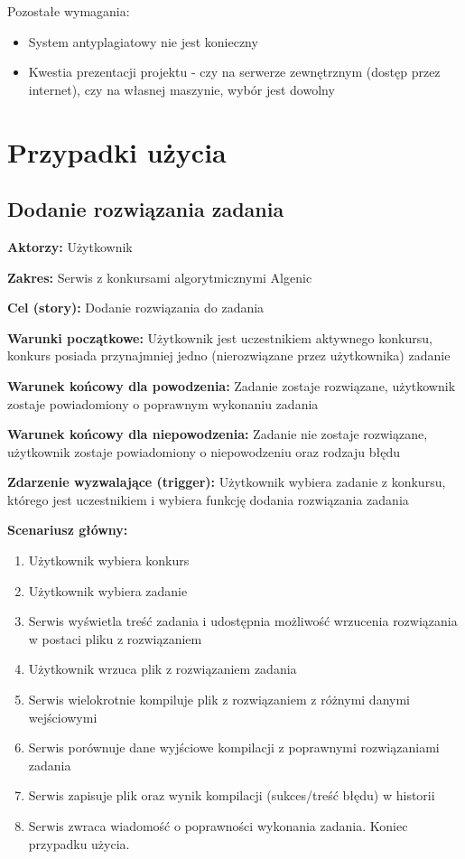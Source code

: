 \documentclass{article}
\begin{document}
Pozostałe wymagania:
\begin{itemize}
	\item System antyplagiatowy nie jest konieczny
	\item Kwestia prezentacji projektu - czy na serwerze zewnętrznym (dostęp przez internet), czy na własnej maszynie, wybór jest dowolny
\end{itemize}

\newpage
\section{Przypadki użycia}

\subsection{Dodanie rozwiązania zadania}

\textbf{Aktorzy:} Użytkownik

\textbf{Zakres:} Serwis z konkursami algorytmicznymi Algenic

\textbf{Cel (story):} Dodanie rozwiązania do zadania

\textbf{Warunki początkowe:} Użytkownik jest uczestnikiem aktywnego konkursu, konkurs posiada przynajmniej jedno (nierozwiązane przez użytkownika) zadanie

\textbf{Warunek końcowy dla powodzenia:} Zadanie zostaje rozwiązane, użytkownik zostaje powiadomiony o poprawnym wykonaniu zadania

\textbf{Warunek końcowy dla niepowodzenia:} Zadanie nie zostaje rozwiązane, użytkownik zostaje powiadomiony o niepowodzeniu oraz rodzaju błędu

\textbf{Zdarzenie wyzwalające (trigger):} Użytkownik wybiera zadanie z konkursu, którego jest uczestnikiem i wybiera funkcję dodania rozwiązania zadania

\textbf{Scenariusz główny:}
\begin{enumerate}
	\item Użytkownik wybiera konkurs
	\item Użytkownik wybiera zadanie
	\item Serwis wyświetla treść zadania i udostępnia możliwość wrzucenia rozwiązania w postaci pliku z rozwiązaniem
	\item Użytkownik wrzuca plik z rozwiązaniem zadania
	\item Serwis wielokrotnie kompiluje plik z rozwiązaniem z różnymi danymi wejściowymi
	\item Serwis porównuje dane wyjściowe kompilacji z poprawnymi rozwiązaniami zadania
	\item Serwis zapisuje plik oraz wynik kompilacji (sukces/treść błędu) w historii
	\item Serwis zwraca wiadomość o poprawności wykonania zadania. Koniec przypadku użycia.
\end{enumerate}
\end{document}
